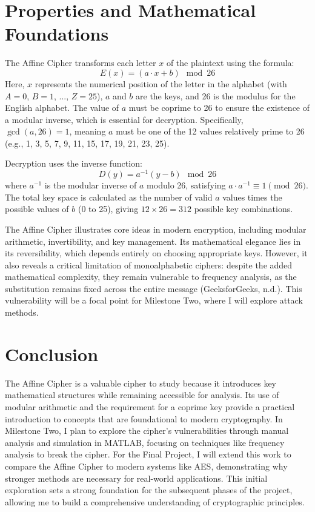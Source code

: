 \documentclass[12pt]{article}
\begin{document}
\section*{Properties and Mathematical Foundations}
The Affine Cipher transforms each letter \( x \) of the plaintext using the formula:
\[
E(x) = (a \cdot x + b) \mod 26
\]
Here, \( x \) represents the numerical position of the letter in the alphabet (with \( A = 0 \), \( B = 1 \), ..., \( Z = 25 \)), \( a \) and \( b \) are the keys, and 26 is the modulus for the English alphabet. The value of \( a \) must be coprime to 26 to ensure the existence of a modular inverse, which is essential for decryption. Specifically, \( \gcd(a, 26) = 1 \), meaning \( a \) must be one of the 12 values relatively prime to 26 (e.g., 1, 3, 5, 7, 9, 11, 15, 17, 19, 21, 23, 25).

Decryption uses the inverse function:
\[
D(y) = a^{-1} (y - b) \mod 26
\]
where \( a^{-1} \) is the modular inverse of \( a \) modulo 26, satisfying \( a \cdot a^{-1} \equiv 1 \pmod{26} \). The total key space is calculated as the number of valid \( a \) values times the possible values of \( b \) (0 to 25), giving \( 12 \times 26 = 312 \) possible key combinations.

The Affine Cipher illustrates core ideas in modern encryption, including modular arithmetic, invertibility, and key management. Its mathematical elegance lies in its reversibility, which depends entirely on choosing appropriate keys. However, it also reveals a critical limitation of monoalphabetic ciphers: despite the added mathematical complexity, they remain vulnerable to frequency analysis, as the substitution remains fixed across the entire message (GeeksforGeeks, n.d.). This vulnerability will be a focal point for Milestone Two, where I will explore attack methods.

\section*{Conclusion}
The Affine Cipher is a valuable cipher to study because it introduces key mathematical structures while remaining accessible for analysis. Its use of modular arithmetic and the requirement for a coprime key provide a practical introduction to concepts that are foundational to modern cryptography. In Milestone Two, I plan to explore the cipher's vulnerabilities through manual analysis and simulation in MATLAB, focusing on techniques like frequency analysis to break the cipher. For the Final Project, I will extend this work to compare the Affine Cipher to modern systems like AES, demonstrating why stronger methods are necessary for real-world applications. This initial exploration sets a strong foundation for the subsequent phases of the project, allowing me to build a comprehensive understanding of cryptographic principles.
\end{document}
